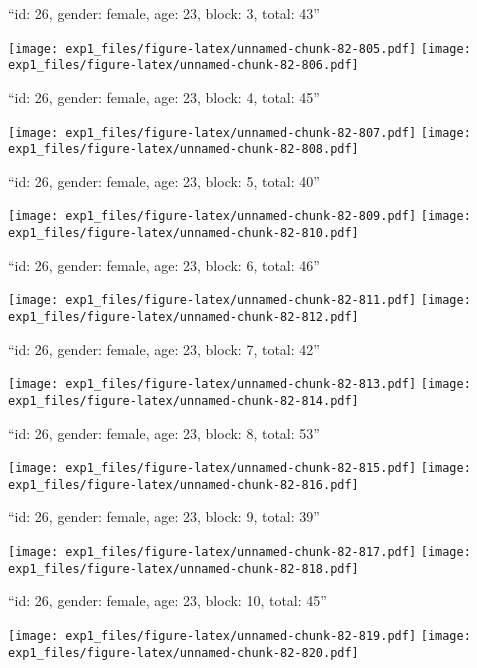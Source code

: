 \documentclass[11pt,,]{article}
\begin{document}
\newpage
[1] 

``id: 26, gender: female, age: 23, block: 3, total: 43''

\texttt{[image: exp1\_files/figure-latex/unnamed-chunk-82-805.pdf]}
\texttt{[image: exp1\_files/figure-latex/unnamed-chunk-82-806.pdf]}

\newpage
[1] 

``id: 26, gender: female, age: 23, block: 4, total: 45''

\texttt{[image: exp1\_files/figure-latex/unnamed-chunk-82-807.pdf]}
\texttt{[image: exp1\_files/figure-latex/unnamed-chunk-82-808.pdf]}

\newpage
[1] 

``id: 26, gender: female, age: 23, block: 5, total: 40''

\texttt{[image: exp1\_files/figure-latex/unnamed-chunk-82-809.pdf]}
\texttt{[image: exp1\_files/figure-latex/unnamed-chunk-82-810.pdf]}

\newpage
[1] 

``id: 26, gender: female, age: 23, block: 6, total: 46''

\texttt{[image: exp1\_files/figure-latex/unnamed-chunk-82-811.pdf]}
\texttt{[image: exp1\_files/figure-latex/unnamed-chunk-82-812.pdf]}

\newpage
[1] 

``id: 26, gender: female, age: 23, block: 7, total: 42''

\texttt{[image: exp1\_files/figure-latex/unnamed-chunk-82-813.pdf]}
\texttt{[image: exp1\_files/figure-latex/unnamed-chunk-82-814.pdf]}

\newpage
[1] 

``id: 26, gender: female, age: 23, block: 8, total: 53''

\texttt{[image: exp1\_files/figure-latex/unnamed-chunk-82-815.pdf]}
\texttt{[image: exp1\_files/figure-latex/unnamed-chunk-82-816.pdf]}

\newpage
[1] 

``id: 26, gender: female, age: 23, block: 9, total: 39''

\texttt{[image: exp1\_files/figure-latex/unnamed-chunk-82-817.pdf]}
\texttt{[image: exp1\_files/figure-latex/unnamed-chunk-82-818.pdf]}

\newpage
[1] 

``id: 26, gender: female, age: 23, block: 10, total: 45''

\texttt{[image: exp1\_files/figure-latex/unnamed-chunk-82-819.pdf]}
\texttt{[image: exp1\_files/figure-latex/unnamed-chunk-82-820.pdf]}
\end{document}
